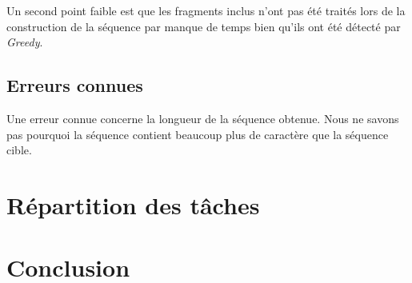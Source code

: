 \documentclass[12pt,a4paper,final]{article}
\begin{document}
Un second point faible est que les fragments inclus n'ont pas été traités lors de la construction de la séquence par manque de temps bien qu'ils ont été détecté par \textit{Greedy}.

\subsection{Erreurs connues}

Une erreur connue concerne la longueur de la séquence obtenue.  Nous ne savons pas pourquoi la séquence contient beaucoup plus de caractère que la séquence cible.

\section{Répartition des tâches}

\section{Conclusion} 



\end{document}
